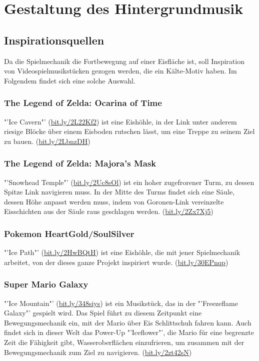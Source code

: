 \documentclass[a4paper,10pt,ngerman]{scrartcl}
\begin{document}
	
	\newpage
	\section{Gestaltung des Hintergrundmusik}
	
		\subsection{Inspirationsquellen}
		
			Da die Spielmechanik die Fortbewegung auf einer Eisfläche ist, soll Inspiration von Videospielmusikstücken gezogen werden, die ein Kälte-Motiv haben. Im Folgendem findet sich eine solche Auswahl.
			
			\subsubsection{The Legend of Zelda: Ocarina of Time}
			
				"'Ice Cavern"' (\href{https://youtube.com/watch?v=bcXuwXKsqMY}{bit.ly/2L22Kf2}) ist eine Eishöhle, in der Link unter anderem riesige Blöcke über einem Eisboden rutschen lässt, um eine Treppe zu seinem Ziel zu bauen. (\href{https://youtube.com/watch?v=uaGb3PtSPDg}{bit.ly/2LbnzDH})
			
			
			\subsubsection{The Legend of Zelda: Majora's Mask}
			
				"'Snowhead Temple"' (\href{https://youtube.com/watch?v=uxPDVDpbskI}{bit.ly/2Uc8sOl}) ist ein hoher zugefrorener Turm, zu dessen Spitze Link navigieren muss. In der Mitte des Turms findet sich eine Säule, dessen Höhe anpasst werden muss, indem von Goronen-Link vereinzelte Eisschichten aus der Säule raus geschlagen werden. (\href{https://youtube.com/watch?v=yM8440G32gk}{bit.ly/2Zx7Xj5})
			
			
			\subsubsection{Pokemon HeartGold/SoulSilver}
			
				"'Ice Path"' (\href{https://youtube.com/watch?v=riClBdyycM4}{bit.ly/2HwBQtH}) ist eine Eishöhle, die mit jener Spielmechanik arbeitet, von der dieses ganze Projekt inspiriert wurde. (\href{https://youtube.com/watch?v=erqrS-e-piA}{bit.ly/30EPnqp})
	
	
			\subsubsection{Super Mario Galaxy}
			
			"'Ice Mountain"' (\href{https://youtube.com/watch?v=9qnJWbEnKOs}{bit.ly/348siys}) ist ein Musikstück, das in der "'Freezeflame Galaxy"' gespielt wird. Das Spiel führt zu diesem Zeitpunkt eine Bewegungsmechanik ein, mit der Mario über Eis Schlittschuh fahren kann. Auch findet sich in dieser Welt das Power-Up "'Iceflower"', die Mario für eine begrenzte Zeit die Fähigkeit gibt, Wasseroberflächen einzufrieren, um zusammen mit der Bewegungsmechanik zum Ziel zu navigieren. (\href{https://youtube.com/watch?v=ImsaYCFMJns}{bit.ly/2zt42sN})
		
\end{document}
